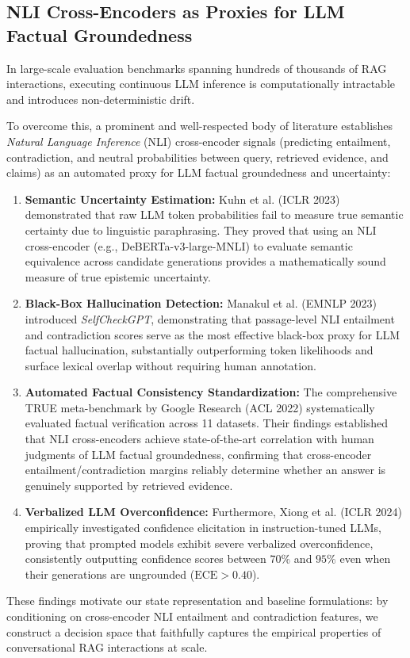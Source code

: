 \subsection{NLI Cross-Encoders as Proxies for LLM Factual Groundedness}
\label{sec:review_nli_proxies}
In large-scale evaluation benchmarks spanning hundreds of thousands of RAG interactions, executing continuous LLM inference is computationally intractable and introduces non-deterministic drift. 

To overcome this, a prominent and well-respected body of literature establishes \textit{Natural Language Inference} (NLI) cross-encoder signals (predicting entailment, contradiction, and neutral probabilities between query, retrieved evidence, and claims) as an automated proxy for LLM factual groundedness and uncertainty:
\begin{enumerate}
    \item \textbf{Semantic Uncertainty Estimation:} Kuhn et al.\cite{kuhn2023semantic} (ICLR 2023) demonstrated that raw LLM token probabilities fail to measure true semantic certainty due to linguistic paraphrasing. They proved that using an NLI cross-encoder (e.g., DeBERTa-v3-large-MNLI) to evaluate semantic equivalence across candidate generations provides a mathematically sound measure of true epistemic uncertainty.
    \item \textbf{Black-Box Hallucination Detection:} Manakul et al. \cite{manakul2023selfcheckgpt} (EMNLP 2023) introduced \emph{SelfCheckGPT}, demonstrating that passage-level NLI entailment and contradiction scores serve as the most effective black-box proxy for LLM factual hallucination, substantially outperforming token likelihoods and surface lexical overlap without requiring human annotation.
    \item \textbf{Automated Factual Consistency Standardization:} The comprehensive TRUE meta-benchmark by Google Research \cite{honovich2022true} (ACL 2022) systematically evaluated factual verification across 11 datasets. Their findings established that NLI cross-encoders achieve state-of-the-art correlation with human judgments of LLM factual groundedness, confirming that cross-encoder entailment/contradiction margins reliably determine whether an answer is genuinely supported by retrieved evidence.
    \item \textbf{Verbalized LLM Overconfidence:} Furthermore, Xiong et al. \cite{xiong2024can} (ICLR 2024) empirically investigated confidence elicitation in instruction-tuned LLMs, proving that prompted models exhibit severe verbalized overconfidence, consistently outputting confidence scores between $70\%$ and $95\%$ even when their generations are ungrounded ($\text{ECE} > 0.40$).
\end{enumerate}

These findings motivate our state representation and baseline formulations: by conditioning on cross-encoder NLI entailment and contradiction features, we construct a decision space that faithfully captures the empirical properties of conversational RAG interactions at scale.
